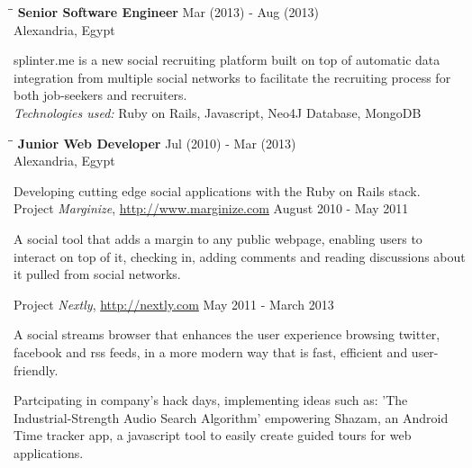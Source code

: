 \documentclass{res}
\newenvironment{details}{\vspace*{-4pt} \begin{list}{\topsep 0pt \itemsep -2pt}}{\vspace*{4pt}\end{list}}
\begin{document}
\begin{resume}
   \begin{tabbing}
   \hspace{2.7in}\= \hspace{1.8in}\= \kill %
    {\bf Senior Software Engineer}\> \hfill Mar (2013) - Aug (2013)\\
                                    \>Alexandria, Egypt
   \end{tabbing}\vspace{-20pt}      %
    splinter.me is a new social recruiting platform built on top of automatic data integration from multiple social networks to facilitate the recruiting process for both job-seekers and recruiters.\\
    {\sl Technologies used:} Ruby on Rails, Javascript, Neo4J Database, MongoDB

   \begin{tabbing}
   \hspace{2.7in}\= \hspace{1.8in}\= \kill %
    {\bf Junior Web Developer}\> \hfill Jul (2010) - Mar (2013)\\
                                    \>Alexandria, Egypt
   \end{tabbing}\vspace{-20pt}      %
   Developing cutting edge social applications with the Ruby on Rails stack.\\
   Project \textit{Marginize}, \url{http://www.marginize.com} {August 2010 - May 2011}
   \begin{details}
   \item A social tool that adds a margin to any public webpage, enabling users to interact on top of it, checking in, adding comments and reading discussions about it pulled from social networks.
   \end{details}
   Project \textit{Nextly}, \url{http://nextly.com} {May 2011 - March 2013}
   \begin{details}
   \item A social streams browser that enhances the user experience browsing twitter, facebook and rss feeds, in a more modern way that is fast, efficient and user-friendly.
   \end{details}
   Partcipating in company's hack days, implementing ideas such as: 'The Industrial-Strength Audio Search Algorithm' empowering Shazam, an Android Time tracker app, a javascript tool to easily create guided tours for web applications.


\end{resume}
\end{document}
